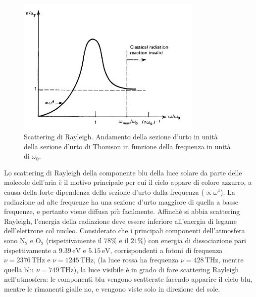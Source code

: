 \begin{figure}
\begin{center}
\includegraphics[width=0.8\textwidth]{img/ScatteringRayleigh}
\caption{Scattering di Rayleigh. Andamento della sezione d'urto in unità della sezione d'urto di Thomson in funzione della frequenza in unità di $\omega_0$.} \label{fig:Rayleigh}
\end{center}
\end{figure}

Lo scattering di Rayleigh della componente blu della luce solare da parte delle molecole dell'aria è il motivo principale per cui il cielo appare di colore azzurro, a causa della forte dipendenza della sezione d'urto dalla frequenza ($\propto\omega^4$). La radiazione ad alte frequenze ha una sezione d'urto maggiore di quella a basse frequenze, e pertanto viene diffusa più facilmente. Affinchè si abbia scattering Rayleigh, l'energia della radiazione deve essere inferiore all'energia di legame dell'elettrone col nucleo. Considerato che i principali componenti dell'atmosfera sono $\mathrm{N}_2$ e $\mathrm{O}_2$ (rispettivamente il $78 \%$ e il $21\%$) con energia di dissociazione pari rispettivamente a $9.39\, \mathrm{eV}$ e $5.15 \, \mathrm{eV}$, corrispondenti a fotoni di frequenza $\nu=2376 \, \mathrm{THz}$ e $\nu=1245 \, \mathrm{THz}$, (la luce rossa ha frequenza $\nu=428 \, \mathrm{THz}$, mentre quella blu $\nu=749 \, \mathrm{THz}$), la luce visibile è in grado di fare scattering Rayleigh nell'atmosfera: le componenti blu vengono scatterate facendo apparire il cielo blu, mentre le rimanenti gialle no, e vengono viste solo in direzione del sole.

